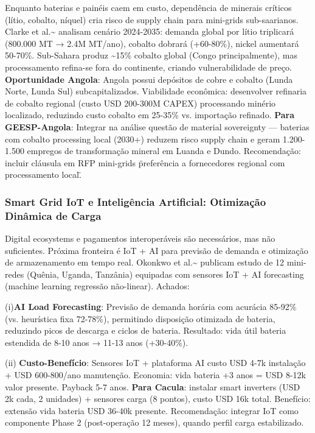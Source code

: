 \documentclass[12pt, a4paper]{article}
\begin{document}
Enquanto baterias e painéis caem em custo, dependência de minerais críticos (lítio, cobalto, níquel) cria risco de supply chain para mini-grids sub-saarianos. Clarke et al.\textasciitilde{}\citep{Clarke2024} analisam cenário 2024-2035: demanda global por lítio triplicará (800.000 MT → 2.4M MT/ano), cobalto dobrará (+60-80\%), nickel aumentará 50-70\%. Sub-Sahara produz \textasciitilde{}15\% cobalto global (Congo principalmente), mas processamento refina-se fora do continente, criando vulnerabilidade de preço.
\textbf{Oportunidade Angola}: Angola possui depósitos de cobre e cobalto (Lunda Norte, Lunda Sul) subcapitalizados. Viabilidade econômica: desenvolver refinaria de cobalto regional (custo USD 200-300M CAPEX) processando minério localizado, reduzindo custo cobalto em 25-35\% vs. importação refinado.
\textbf{Para GEESP-Angola}: Integrar na análise questão de material sovereignty — baterias com cobalto processing local (2030+) reduzem risco supply chain e geram 1.200-1.500 empregos de transformação mineral em Luanda e Dundo. Recomendação: incluir cláusula em RFP mini-grids \"preferência a fornecedores regional com processamento local\".

\subsubsection{Smart Grid IoT e Inteligência Artificial: Otimização Dinâmica de Carga}

Digital ecosystems e pagamentos interoperáveis são necessários, mas não suficientes. Próxima fronteira é IoT + AI para previsão de demanda e otimização de armazenamento em tempo real. Okonkwo et al.\textasciitilde{}\citep{Okonkwo2025} publicam estudo de 12 mini-redes (Quênia, Uganda, Tanzânia) equipadas com sensores IoT + AI forecasting (machine learning regressão não-linear). Achados: 

(i)\textbf{AI Load Forecasting}: Previsão de demanda horária com acurácia 85-92\% (vs. heurística fixa 72-78\%), permitindo disposição otimizada de bateria, reduzindo picos de descarga e ciclos de bateria. Resultado: vida útil bateria estendida de 8-10 anos → 11-13 anos (+30-40\%).

(ii)
\textbf{Custo-Benefício}: Sensores IoT + plataforma AI custo USD 4-7k instalação + USD 600-800/ano manutenção. Economia: vida bateria +3 anos = USD 8-12k valor presente. Payback 5-7 anos.
\textbf{Para Cacula}: instalar smart inverters (USD 2k cada, 2 unidades) + sensores carga (8 pontos), custo USD 16k total. Benefício: extensão vida bateria USD 36-40k presente. Recomendação: integrar IoT como componente Phase 2 (post-operação 12 meses), quando perfil carga estabilizado.
\end{document}
